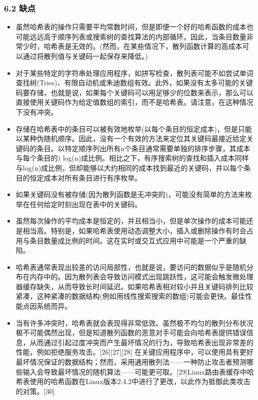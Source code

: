 \subsubsection{6.2 缺点}
\begin{itemize}
\item 虽然哈希表的操作只需要平均常数时间，但是即便一个好的哈希函数的成本也可能远远高于顺序列表或搜索树的查找算法的内部循环。因此，当条目数量非常少时，哈希表是无效的。(然而，在某些情况下，散列函数计算的高成本可以通过将散列值与关键码一起保存来降低。)
\item 对于某些特定的字符串处理应用程序，如拼写检查，散列表可能不如尝试单词查找树(Tries)、有限自动机或朱迪数组有效。此外，如果没有太多可能的关键码要存储，也就是说，如果每个关键码可以用足够少的位数来表示，那么可以直接使用关键码作为给定值数组的索引，而不是哈希表。请注意，在这种情况下没有冲突。
\item 存储在哈希表中的条目可以被有效地枚举(以每个条目的恒定成本)，但是只能以某种伪随机顺序。因此，没有一个有效的方法来定位其关键码最接近给定关键码的条目。以特定顺序列出所有n个条目通常需要单独的排序步骤，其成本与每个条目的) log(n)成比例。相比之下，有序搜索树的查找和插入成本同样与log(n)成比例，但却能够以大约相同的成本找到最近的关键码，并以每个条目的恒定成本对所有条目进行有序枚举。
\item 如果关键码没有被存储(因为散列函数是无冲突的)，可能没有简单的方法来枚举在任何给定时刻出现在表中的关键码。
\item 虽然每次操作的平均成本是恒定的，并且相当小，但是单次操作的成本可能还是相当高。特别是，如果哈希表使用动态调整大小，插入或删除操作有时会占用与条目数量成比例的时间。这在实时或交互式应用中可能是一个严重的缺陷。
\item 哈希表通常表现出较差的访问局部性，也就是说，要访问的数据似乎是随机分布在内存中的。因为散列表会导致访问模式出现跳跃性，这可能会触发微处理器缓存缺失，从而导致长时间延迟。如果哈希表相对较小并且关键码排列比较紧凑，这种紧凑的数据结构(例如用线性搜索搜索的数组)可能会更快。最佳性能点因系统而异。
\item 当有许多冲突时，哈希表就会表现得非常低效。虽然极不均匀的散列分布状况极不可能偶然出现，但是知道散列函数的恶意对手可能会向哈希表提供错误信息，从而通过引起过度冲突而产生最坏情况的行为，导致哈希表出现非常差的性能，例如拒绝服务攻击。[26][27][28] 在关键应用程序中，可以使用具有更好最坏情况保证的数据结构；然而，采用通用散列法——一种防止攻击者预测哪些输入会导致最坏情况的随机算法——可能更可取。[29]Linux路由表缓存中哈希表使用的哈希函数在Linux版本2.4.2中进行了更改，以此作为抵御此类攻击的对策。[30]
\end{itemize}

